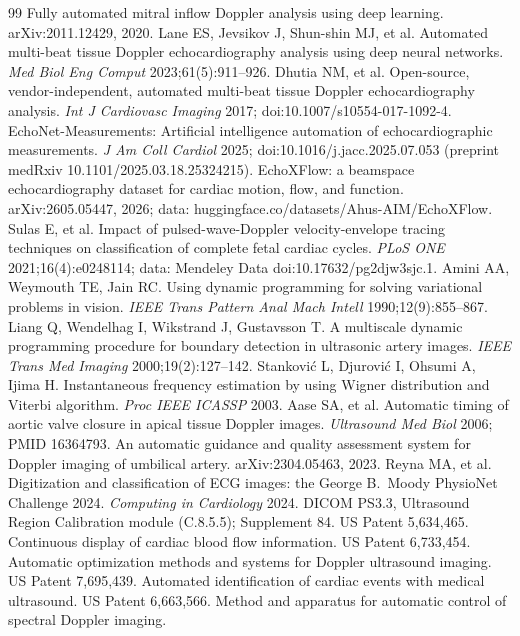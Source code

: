 \documentclass[10pt,a4paper]{article}
\begin{document}
\begin{thebibliography}{99}
 Fully automated mitral inflow Doppler analysis using deep learning. arXiv:2011.12429, 2020.
 Lane ES, Jevsikov J, Shun-shin MJ, et al. Automated multi-beat tissue Doppler echocardiography analysis using deep neural
networks. \emph{Med Biol Eng Comput} 2023;61(5):911--926.
 Dhutia NM, et al. Open-source, vendor-independent, automated multi-beat tissue Doppler echocardiography analysis.
\emph{Int J Cardiovasc Imaging} 2017; doi:10.1007/s10554-017-1092-4.
 EchoNet-Measurements: Artificial intelligence automation of echocardiographic measurements. \emph{J Am Coll Cardiol} 2025;
doi:10.1016/j.jacc.2025.07.053 (preprint medRxiv 10.1101/2025.03.18.25324215).
 EchoXFlow: a beamspace echocardiography dataset for cardiac motion, flow, and function. arXiv:2605.05447, 2026;
data: huggingface.co/datasets/Ahus-AIM/EchoXFlow.
 Sulas E, et al. Impact of pulsed-wave-Doppler velocity-envelope tracing techniques on classification of complete fetal cardiac
cycles. \emph{PLoS ONE} 2021;16(4):e0248114; data: Mendeley Data doi:10.17632/pg2djw3sjc.1.
 Amini AA, Weymouth TE, Jain RC. Using dynamic programming for solving variational problems in vision.
\emph{IEEE Trans Pattern Anal Mach Intell} 1990;12(9):855--867.
 Liang Q, Wendelhag I, Wikstrand J, Gustavsson T. A multiscale dynamic programming procedure for boundary detection in
ultrasonic artery images. \emph{IEEE Trans Med Imaging} 2000;19(2):127--142.
 Stankovi\'c L, Djurovi\'c I, Ohsumi A, Ijima H. Instantaneous frequency estimation by using Wigner distribution and Viterbi
algorithm. \emph{Proc IEEE ICASSP} 2003.
 Aase SA, et al. Automatic timing of aortic valve closure in apical tissue Doppler images. \emph{Ultrasound Med Biol} 2006; PMID 16364793.
 An automatic guidance and quality assessment system for Doppler imaging of umbilical artery. arXiv:2304.05463, 2023.
 Reyna MA, et al. Digitization and classification of ECG images: the George B.\ Moody PhysioNet Challenge 2024.
\emph{Computing in Cardiology} 2024.
 DICOM PS3.3, Ultrasound Region Calibration module (C.8.5.5); Supplement 84.
 US Patent 5,634,465. Continuous display of cardiac blood flow information.
 US Patent 6,733,454. Automatic optimization methods and systems for Doppler ultrasound imaging.
 US Patent 7,695,439. Automated identification of cardiac events with medical ultrasound.
 US Patent 6,663,566. Method and apparatus for automatic control of spectral Doppler imaging.
\end{thebibliography}
\end{document}
